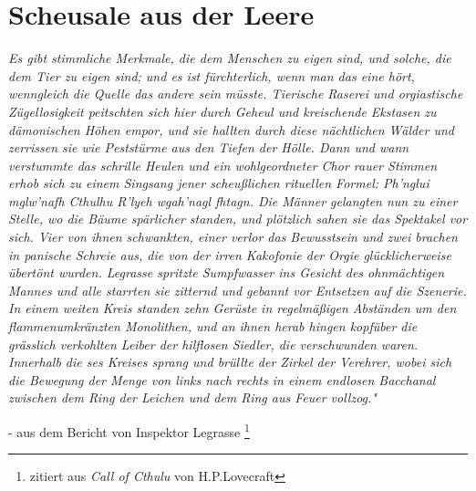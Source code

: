 \documentclass[12pt,twoside,twocolumn,openany]{book}
\begin{document}
\section{Scheusale aus der Leere}
\begin{quotebox}
	\textit{
		Es gibt	stimmliche  Merkmale,  die  dem  Menschen  zu  eigen  sind,  und solche,  die  dem  Tier  zu  eigen  sind;  und  es  ist  fürchterlich,		wenn  man  das  eine  hört,  wenngleich  die  Quelle  das  andere sein  müsste.  Tierische  Raserei  und orgiastische  Zügellosigkeit	peitschten  sich  hier  durch  Geheul  und  kreischende  Ekstasen		zu  dämonischen  Höhen  empor,  und  sie  hallten  durch  diese		nächtlichen  Wälder  und  zerrissen  sie  wie  Peststürme  aus  den
		Tiefen  der  Hölle.  Dann  und  wann  verstummte  das  schrille	Heulen  und  ein  wohlgeordneter  Chor  rauer  Stimmen  erhob		sich  zu  einem  Singsang  jener  scheußlichen  rituellen  Formel:
		\emph{Ph’nglui mglw’nafh Cthulhu R’lyeh wgah’nagl fhtagn.}
		Die  Männer  gelangten  nun  zu  einer  Stelle,  wo  die  Bäume		spärlicher  standen,  und  plötzlich  sahen  sie  das  Spektakel  vor		sich. Vier von ihnen schwankten, einer verlor das Bewusstsein		und  zwei  brachen  in  panische  Schreie  aus,  die  von  der  irren	Kakofonie der Orgie glücklicherweise übertönt wurden. 
		Legrasse spritzte Sumpfwasser ins Gesicht des ohnmächtigen
		Mannes  und  alle  starrten  sie  zitternd  und  gebannt  vor  Entsetzen  auf  die  Szenerie. 
		In  einem  weiten  Kreis  standen  zehn  Gerüste  in  regelmäßigen
		Abständen  um  den  flammenumkränzten  Monolithen,  und  an
		ihnen  herab  hingen  kopfüber  die  grässlich  verkohlten  Leiber
		der  hilflosen  Siedler,  die  verschwunden  waren.  Innerhalb  die	ses  Kreises  sprang  und  brüllte  der  Zirkel  der  Verehrer,  wobei
		sich die Bewegung der Menge von links nach rechts in einem
		endlosen Bacchanal zwischen dem Ring der Leichen und dem
		Ring aus Feuer vollzog."}
	\begin{flushright}
		- aus dem Bericht von Inspektor Legrasse \footnote{zitiert aus \emph{Call of Cthulu} von H.P.Lovecraft}
	\end{flushright}
\end{quotebox}
\end{document}

